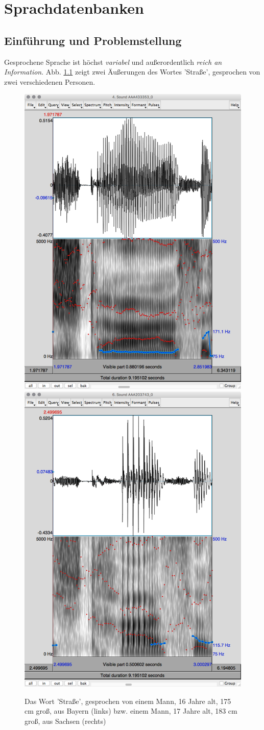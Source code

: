 \documentclass[11pt]{book}
\begin{document}
\chapter{Sprachdatenbanken}

\section{Einführung und Problemstellung}

Gesprochene Sprache ist höchst {\em variabel} und außerordentlich {\em reich an Information}. Abb. \ref{fig_sdb_strasse} zeigt zwei Äußerungen des Wortes 'Straße', gesprochen von zwei verschiedenen Personen.

\begin{figure}[htbp]
\begin{center}
\includegraphics[width=.49\textwidth]{grafiken/sprachdatenbanken/STRASSE433353}
\includegraphics[width=.49\textwidth]{grafiken/sprachdatenbanken/STRASSE203743}
\caption{Das Wort 'Straße', gesprochen von einem Mann, 16 Jahre alt, 175 cm groß, aus Bayern (links) bzw. einem Mann, 17 Jahre alt, 183 cm groß, aus Sachsen (rechts)}
\label{fig_sdb_strasse}
\end{center}
\end{figure}
\end{document}
